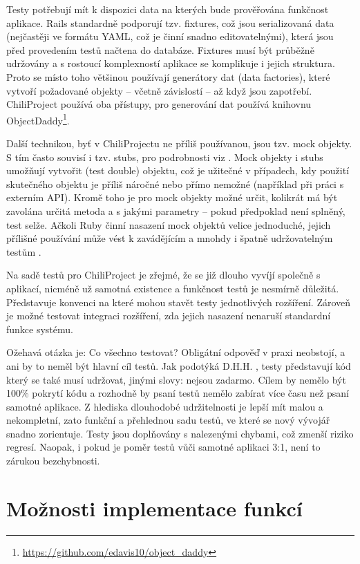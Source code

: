 \documentclass[thesis=B,czech]{FITthesis}[2012/05/02]
\begin{document}
Testy potřebují mít k dispozici data na kterých bude prověřována
funkčnost aplikace. Rails standardně podporují tzv. fixtures, což jsou
serializovaná data (nejčastěji ve formátu \gls{YAML}, což je činní
snadno editovatelnými), která jsou před provedením testů načtena do
databáze. Fixtures musí být průběžně udržovány a s rostoucí komplexností
aplikace se komplikuje i jejich struktura. Proto se místo toho většinou
používají generátory dat (data factories), které vytvoří požadované
objekty -- včetně závislostí -- až když jsou zapotřebí. ChiliProject
používá oba přístupy, pro generování dat používá knihovnu
ObjectDaddy\footnote{\url{https://github.com/edavis10/object_daddy}}.

Další technikou, byť v ChiliProjectu ne příliš používanou, jsou tzv.
mock objekty. S tím často souvisí i tzv. stubs, pro podrobnosti viz
\citep{FowlerMocks}. Mock objekty i stubs umožňují vytvořit
 (test double) objektu, což je užitečné
v případech, kdy použití skutečného objektu je příliš náročné nebo přímo
nemožné (například při práci s externím API). Kromě toho je pro
mock objekty možné určit, kolikrát má být zavolána určitá metoda a
s jakými parametry -- pokud předpoklad není splněný, test selže. Ačkoli
Ruby činní nasazení mock objektů velice jednoduché, jejich přílišné
používání může vést k zavádějícím a mnohdy i špatně udržovatelným testům
\citep{Parsons2011}.

Na sadě testů pro ChiliProject je zřejmé, že se již dlouho vyvíjí
společně s aplikací, nicméně už samotná existence a funkčnost testů je
nesmírně důležitá. Představuje konvenci na které mohou stavět testy
jednotlivých rozšíření. Zároveň je možné testovat integraci rozšíření,
zda jejich nasazení nenaruší standardní funkce systému.

Ožehavá otázka je: Co všechno testovat? Obligátní odpověď 
v praxi neobstojí, a ani by to neměl být hlavní cíl testů. Jak podotýká
D.H.H. \citep{HanssonTestingTSA}, testy představují kód který se
také musí udržovat, jinými slovy: nejsou zadarmo. Cílem by nemělo být
100\% pokrytí kódu a rozhodně by psaní testů nemělo zabírat více času
než psaní samotné aplikace. Z hlediska dlouhodobé udržitelnosti je lepší
mít malou a nekompletní, zato funkční a přehlednou sadu testů, ve které
se nový vývojář snadno zorientuje. Testy jsou doplňovány s nalezenými
chybami, což zmenší riziko regresí. Naopak, i pokud je poměr testů vůči
samotné aplikaci 3:1, není to zárukou bezchybnosti.

\section{Možnosti implementace funkcí}
\end{document}
